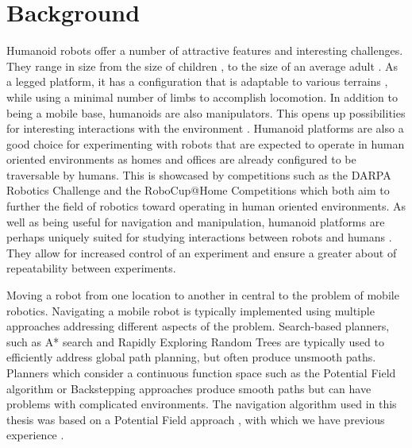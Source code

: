 \section{Background}
Humanoid robots offer a number of attractive features and interesting
challenges.
They range in size from the size of children \cite{Ishida2003, Ha2011,
Gouaillier2009, Tsagarakis2007iCubTD}, to the size of an average
adult \cite{asimo_website, atlas_website, robonaut_website, Radford2015}.
As a legged platform, it has a configuration that is adaptable 
to various terrains \cite{Iida2010, Wu2010, Lutz2012}, 
while using a minimal number of limbs to accomplish locomotion. 
In addition to being a mobile base, humanoids are also manipulators. 
This opens up possibilities for interesting interactions
with the environment \cite{levine2016, Koval2015, coleman2015}.
Humanoid platforms are also a good choice for experimenting with robots that
are expected to operate in human oriented environments as 
homes and offices are already configured to be traversable by humans.
This is showcased by competitions such as the DARPA Robotics Challenge
\cite{drc_website} and the RoboCup@Home Competitions
\cite{robocupathome_website} which both aim to further the field of robotics
toward operating in human oriented environments.
As well as being useful for navigation and manipulation, humanoid platforms
are perhaps uniquely suited for studying interactions between robots and
humans \cite{Ismail2012, Moshkina2011}. They allow for increased control
of an experiment and ensure a greater about of repeatability between
experiments.

Moving a robot from one location to another in central to the problem of
mobile robotics. Navigating a mobile robot is typically implemented using
multiple approaches addressing different aspects of the problem.
Search-based planners, such as A* search \cite{Hart1968, gonzalez2011search,
Likhachev04ara} and Rapidly Exploring Random Trees \cite{Lavalle98rapidly} are
typically used to efficiently address global path planning, but often produce
unsmooth paths.
Planners which consider a continuous function space such as the Potential Field
algorithm \cite{ArambulaCosio2004, Koren1991, Hogan1984, Fox1997} or
Backstepping approaches \cite{Park2011, Park2015} produce smooth paths but can
have problems with complicated environments.
The navigation algorithm used in this thesis was based on a Potential Field
approach \cite{Krishnamurthy2007}, with which we have previous experience
\cite{Brooks2013}.

